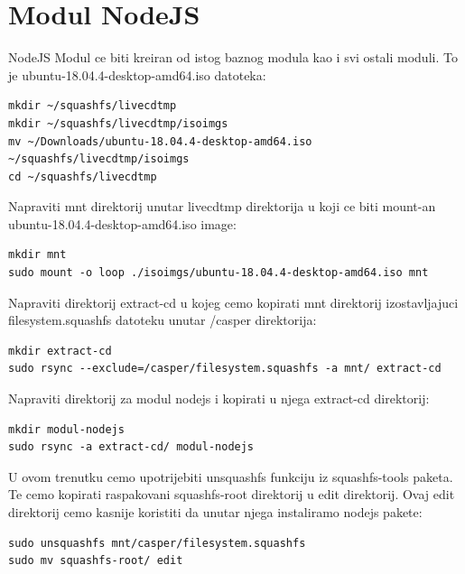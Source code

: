 \documentclass[12pt,vi]{mitthesis}
\begin{document}
\chapter*{Modul NodeJS}
NodeJS Modul ce biti kreiran od istog baznog modula kao i svi ostali moduli. To je ubuntu-18.04.4-desktop-amd64.iso datoteka:
\begin{lstlisting}[style=BashInputStyle]
mkdir ~/squashfs/livecdtmp
mkdir ~/squashfs/livecdtmp/isoimgs
mv ~/Downloads/ubuntu-18.04.4-desktop-amd64.iso ~/squashfs/livecdtmp/isoimgs
cd ~/squashfs/livecdtmp
\end{lstlisting}

\noindent
Napraviti mnt direktorij unutar livecdtmp direktorija u koji ce biti mount-an ubuntu-18.04.4-desktop-amd64.iso image:
\begin{lstlisting}[style=BashInputStyle]
mkdir mnt
sudo mount -o loop ./isoimgs/ubuntu-18.04.4-desktop-amd64.iso mnt
\end{lstlisting}

\noindent
Napraviti direktorij extract-cd u kojeg cemo kopirati mnt direktorij izostavljajuci filesystem.squashfs datoteku unutar /casper direktorija:
\begin{lstlisting}[style=BashInputStyle]
mkdir extract-cd
sudo rsync --exclude=/casper/filesystem.squashfs -a mnt/ extract-cd
\end{lstlisting}

\noindent
Napraviti direktorij za modul nodejs i kopirati u njega extract-cd direktorij:
\begin{lstlisting}[style=BashInputStyle]
mkdir modul-nodejs
sudo rsync -a extract-cd/ modul-nodejs
\end{lstlisting}

\noindent
U ovom trenutku cemo upotrijebiti unsquashfs funkciju iz squashfs-tools paketa. Te cemo kopirati raspakovani squashfs-root direktorij u edit direktorij. Ovaj edit direktorij cemo kasnije koristiti da unutar njega instaliramo nodejs pakete:
\begin{lstlisting}[style=BashInputStyle]
sudo unsquashfs mnt/casper/filesystem.squashfs
sudo mv squashfs-root/ edit
\end{lstlisting}
\end{document}

